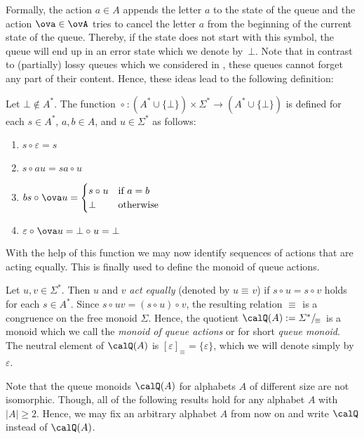 \documentclass[a4paper,numberwithinsect,USenglish]{lipics-v2018}
\theoremstyle{plain}
\theoremstyle{remark}
\newcommand{\partition}[2]{\ensuremath{#1/_{\!#2}}}
\newcommand{\equivx}[1][]{\equiv_{#1}}
\newcommand{\Qx}{\calQ}
\newcommand{\opx}[1][]{\circ_{#1}}
\renewcommand{\epsilon}{\varepsilon}
\begin{document}
Formally, the action $a\in A$ appends the letter $a$ to the state of the queue and the action $\ova\in\ovA$ tries to cancel the letter $a$ from the beginning of the current state of the queue. Thereby, if the state does not start with this symbol, the queue will end up in an error state which we denote by~$\bot$. Note that in contrast to (partially) lossy queues which we considered in \cite{KKP18,Koe18}, these queues cannot forget any part of their content. Hence, these ideas lead to the following definition:

\begin{definition}
	Let $\bot\notin A^*$. The function $\opx\colon(A^*\cup\{\bot\})\times\varSigma^*\to(A^*\cup\{\bot\})$ is defined for each $s\in A^*$, $a,b\in A$, and $u\in\varSigma^*$ as follows:
	\begin{enumerate}[(1)]
		\item $s\opx \varepsilon=s$
		\item $s\opx au=sa\opx u$
		\item $bs\opx \ova u=\begin{cases}
		s\opx u & \text{if }a=b\\
		\bot & \text{otherwise}
		\end{cases}$
		\item $\varepsilon\opx \ova u=\bot\opx u=\bot$
	\end{enumerate}
\end{definition}

With the help of this function we may now identify sequences of actions that are acting equally. This is finally used to define the monoid of queue actions.

\begin{definition}
	Let $u,v\in\varSigma^*$. Then $u$ and $v$ \emph{act equally} (denoted by ${u\equivx v}$) if $s\opx u=s\opx v$ holds for each $s\in A^*$.
	Since $s\opx uv=(s\opx u)\opx v$, the resulting relation $\equivx$
	is a congruence on the free monoid $\varSigma$. Hence, the
	quotient $\Qx(A):=\partition{\varSigma^*}{\equivx}$ is a monoid
	which we call the \emph{monoid of queue actions} or for short \emph{queue monoid}. 
	The neutral element of $\Qx(A)$ is $[\epsilon]_{\equivx} = \{\epsilon\}$, which we will denote simply by $\epsilon$.
\end{definition}

Note that the queue monoids $\Qx(A)$ for alphabets $A$ of different size are not isomorphic. Though, all of the following results hold for any alphabet $A$ with $|A|\geq2$. Hence, we may fix an arbitrary alphabet $A$ from now on and write $\Qx$ instead of $\Qx(A)$.
\end{document}
